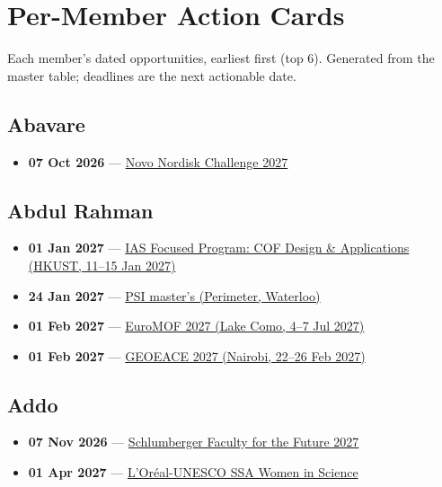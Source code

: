 \section{Per-Member Action Cards}

\noindent Each member's dated opportunities, earliest first (top 6). Generated from the master table; deadlines are the next actionable date.

\subsection*{Abavare}
\begin{itemize}[leftmargin=1.4em,itemsep=0.1em]
  \item \textbf{07 Oct 2026} --- \href{https://ogr.knust.edu.gh/funding/novo-nordisk-foundation-challenge-programme-2027-harnessing-novel-earth-abundant-materials}{Novo Nordisk Challenge 2027}
\end{itemize}

\subsection*{Abdul Rahman}
\begin{itemize}[leftmargin=1.4em,itemsep=0.1em]
  \item \textbf{01 Jan 2027} --- \href{https://iasprogram.hkust.edu.hk/2027cofda/home.php}{IAS Focused Program: COF Design \& Applications (HKUST, 11--15 Jan 2027)}
  \item \textbf{24 Jan 2027} --- \href{https://perimeterinstitute.ca/training/masters-program/psi-how-apply}{PSI master's (Perimeter, Waterloo)}
  \item \textbf{01 Feb 2027} --- \href{https://euromof2027.com/}{EuroMOF 2027 (Lake Como, 4--7 Jul 2027)}
  \item \textbf{01 Feb 2027} --- \href{https://gsk.or.ke/geoeace27/}{GEOEACE 2027 (Nairobi, 22--26 Feb 2027)}
\end{itemize}

\subsection*{Addo}
\begin{itemize}[leftmargin=1.4em,itemsep=0.1em]
  \item \textbf{07 Nov 2026} --- \href{https://schlumbergerfoundation.com/apply-now/}{Schlumberger Faculty for the Future 2027}
  \item \textbf{01 Apr 2027} --- \href{https://www.fondationloreal.com/our-programs-women-science-national-and-regional-young-talents-programs/sub-saharan-africa-young}{L'Oréal-UNESCO SSA Women in Science}
\end{itemize}

